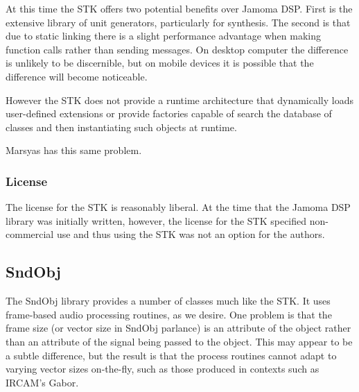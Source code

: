 \documentclass[twoside,10pt]{article}
\begin{document}
At this time the STK offers two potential benefits over Jamoma DSP.  First is the extensive library of unit generators, particularly for synthesis.  The second is that due to static linking there is a slight performance advantage when making function calls rather than sending messages.  On desktop computer the difference is unlikely to be discernible, but on mobile devices it is possible that the difference will become noticeable.

However the STK does not provide a runtime architecture that dynamically loads user-defined extensions or provide factories capable of search the database of classes and then instantiating such objects at runtime.

Marsyas has this same problem.  



\subsubsection{License}
The license for the STK is reasonably liberal.  At the time that the Jamoma DSP library was initially written, however, the license for the STK specified non-commercial use and thus using the STK was not an option for the authors.  


\subsection{SndObj} %

The SndObj\cite{Lazzarini:2001} library provides a number of classes much like the STK.  It uses frame-based audio processing routines, as we desire.  One problem is that the frame size (or vector size in SndObj parlance) is an attribute of the object rather than an attribute of the signal being passed to the object.  This may appear to be a subtle difference, but the result is that the process routines cannot adapt to varying vector sizes on-the-fly, such as those produced in contexts such as IRCAM's Gabor.

\end{document}
